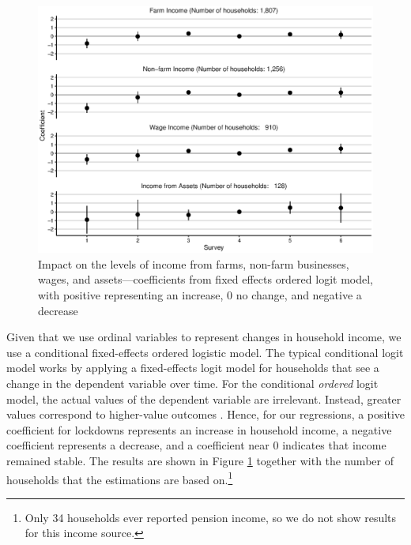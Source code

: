 \documentclass{wber}
\begin{document}
\begin{figure}
\caption{Impact on the levels of income from farms, non-farm businesses,
wages, and assets---coefficients from fixed effects ordered logit
model, with positive representing an increase, 0 no change, and negative
a decrease}\label{fig:income_sources}
\begin{center}
\includegraphics[width=\linewidth, keepaspectratio]{./eps/fig_09.eps}
\end{center}
\end{figure}

Given that we use ordinal variables to represent changes in household
income, we use a conditional fixed-effects ordered logistic model. The
typical conditional logit model works by applying a fixed-effects logit
model for households that see a change in the dependent variable over
time. For the conditional \emph{ordered} logit model, the actual values
of the dependent variable are irrelevant. Instead, greater values
correspond to higher-value outcomes \citep{Baetschmann2015}. Hence, for
our regressions, a positive coefficient for lockdowns represents an
increase in household income, a negative coefficient represents a
decrease, and a coefficient near 0 indicates that income remained
stable. The results are shown in Figure \ref{fig:income_sources} together
with the number of households that the estimations are based
on.\footnote{Only 34 households ever reported pension income, so we do
  not show results for this income source.}
\end{document}

